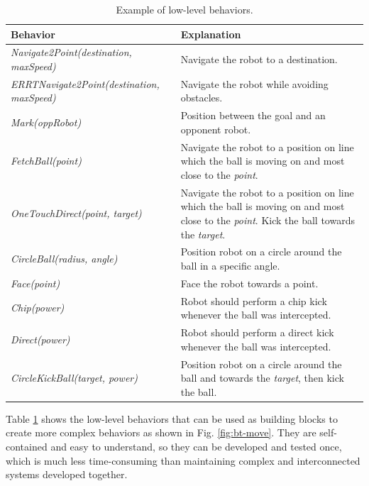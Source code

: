 \documentclass[runningheads]{llncs}
\begin{document}
\begin{table}[H]
    \centering
    \footnotesize
    \caption{Example of low-level behaviors.}
    \label{tab:low-level-behaviors}
    \begin{tabular}{|p{}|p{6cm}|}
        \hline
        \bf{Behavior} &  \bf{Explanation} \\
        \hline
        {\itshape Navigate2Point(destination, maxSpeed)} & Navigate the robot to a destination.\\
        {\itshape ERRTNavigate2Point(destination, maxSpeed)} & Navigate the robot while avoiding obstacles.\\
        {\itshape Mark(oppRobot)} & Position between the goal and an opponent robot.\\
        {\itshape FetchBall(point)} & Navigate the robot to a position on line which the ball is moving on and most close to the \textit{point}.\\
        {\itshape OneTouchDirect(point, target)} & Navigate the robot to a position on line which the ball is moving on and most close to the \textit{point}. Kick the ball towards the \textit{target}.\\
        {\itshape CircleBall(radius, angle)} & Position robot on a circle around the ball in a specific angle.\\
        {\itshape Face(point)} & Face the robot towards a point.\\
        {\itshape Chip(power)} & Robot should perform a chip kick whenever the ball was intercepted.\\
        {\itshape Direct(power)} & Robot should perform a direct kick whenever the ball was intercepted.\\
        {\itshape CircleKickBall(target, power)} & Position robot on a circle around the ball and towards the \textit{target}, then kick the ball.\\
        \hline
    \end{tabular}
\end{table}

Table \ref{tab:low-level-behaviors} shows the low-level behaviors that can be used as building blocks to create more complex behaviors as shown in Fig. \ref{fig:bt-move}. They are self-contained and easy to understand, so they can be developed and tested once, which is much less time-consuming than maintaining complex and interconnected systems developed together.
\end{document}
